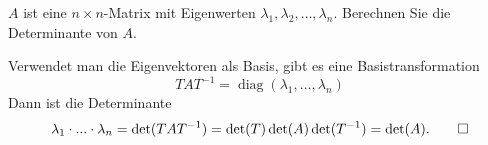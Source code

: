$A$ ist eine $n\times n$-Matrix mit Eigenwerten
$\lambda_1,\lambda_2,\dots,\lambda_n$.
Berechnen Sie die Determinante von $A$.


\begin{loesung}
Verwendet man die Eigenvektoren als Basis, gibt es eine Basistransformation
\[
TAT^{-1}=\operatorname{diag}(\lambda_1,\dots,\lambda_n)
\]
Dann ist die Determinante
\[
\lambda_1\cdot ... \cdot\lambda_n
=
\det(TAT^{-1})
=
\det(T)\det(A)\det(T^{-1})
=
\det(A).
\qedhere
\]
\end{loesung}
